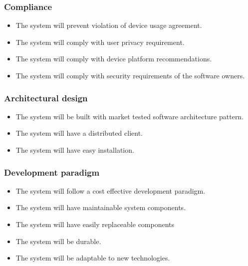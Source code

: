 \subsubsection{Compliance}
		\begin{itemize}
		     \item The system will prevent violation of device usage agreement.
             \item The system will comply with user privacy requirement.
             \item The system will comply with device platform recommendations.
             \item The system will comply with security requirements of the software owners.

	    \end{itemize}
\subsubsection{Architectural design}
    \begin{itemize}
        \item The system will be built with market tested software architecture pattern.
        \item The system will have a distributed client.
        \item The system will have easy installation.

    \end{itemize}
\subsubsection{Development paradigm}
    \begin{itemize}
        \item The system will follow a cost effective development paradigm.
        \item The system will have maintainable system components.
        \item The system will have easily replaceable components
        \item The system will be durable.
        \item The system will be adaptable to new technologies.

    \end{itemize}
